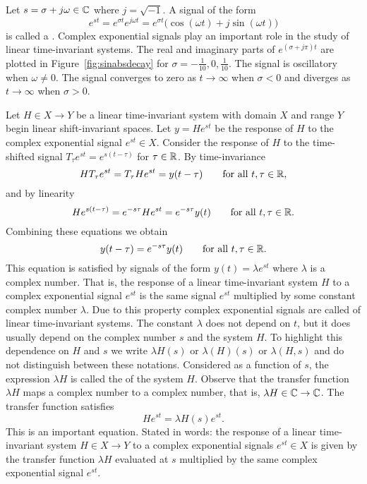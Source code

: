 Let $s = \sigma + j \omega \in {\mathbb C}$ where $j = \sqrt{-1}$.  A signal of the form 
\[
e^{st} = e^{\sigma t}e^{j \omega t} = e^{\sigma t} \big( \cos(\omega t) + j \sin(\omega t) \big)
\]
is called a .  Complex exponential signals play an important role in the study of linear time-invariant systems.  The real and imaginary parts of $e^{(\sigma + j\pi)t}$ are plotted in Figure~\ref{fig:sinabsdecay} for $\sigma = -\tfrac{1}{10},0,\tfrac{1}{10}$.  The signal is oscillatory when $\omega \neq 0$.  The signal converges to zero as $t\to\infty$ when $\sigma<0$ and diverges as $t\to\infty$ when $\sigma > 0$.  

Let $H \in X \to Y$ be a linear time-invariant system with domain $X$ and range $Y$ begin linear shift-invariant spaces.  Let $y = H e^{st}$ be the response of $H$ to the complex exponential signal $e^{st} \in X$.  Consider the response of $H$ to the time-shifted signal $T_\tau e^{st} = e^{s(t-\tau)}$ for $\tau \in {\mathbb R}$.  By time-invariance
\[
H T_{\tau} e^{st} = T_{\tau} H  e^{st} = y(t - \tau) \qquad \text{for all $t, \tau \in {\mathbb R}$},
\]
and by linearity
\[
H e^{s(t-\tau)} = e^{-s\tau} H e^{st}  = e^{-s\tau} y(t) \qquad \text{for all $t, \tau \in {\mathbb R}$}.
\]
Combining these equations we obtain
\[
y(t - \tau) = e^{-s\tau} y(t) \qquad \text{for all $t,\tau \in {\mathbb R}$}.
\]
This equation is satisfied by signals of the form $y(t) = \lambda e^{st}$ where $\lambda$ is a complex number.  That is, the response of a linear time-invariant system $H$ to a complex exponential signal $e^{st}$ is the same signal $e^{st}$ multiplied by some constant complex number $\lambda$.  Due to this property complex exponential signals are called  of linear time-invariant systems.  The constant $\lambda$ does not depend on $t$, but it does usually depend on the complex number $s$ and the system $H$.  To highlight this dependence on $H$ and $s$ we write $\lambda H(s)$ or $\lambda(H)(s)$ or $\lambda(H,s)$ and do not distinguish between these notations.  Considered as a function of $s$, the expression $\lambda H$ is called the  of the system $H$.  Observe that the transfer function $\lambda H$ maps a complex number to a complex number, that is, $\lambda H \in {\mathbb C} \to {\mathbb C}$.  The transfer function satisfies
\begin{equation}\label{eq:transfuneigenproperty}
H e^{st} = \lambda H(s) e^{st}.
\end{equation}
This is an important equation.  Stated in words: the response of a linear time-invariant system $H \in X \to Y$ to a complex exponential signals $e^{st} \in X$ is given by the transfer function $\lambda H$ evaluated at $s$ multiplied by the same complex exponential signal $e^{st}$.

